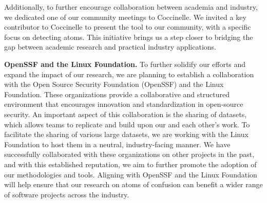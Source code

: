 \documentclass[conference]{IEEEtran}
\begin{document}
Additionally, to further encourage collaboration between 
academia and industry, we dedicated one of our community 
meetings to Coccinelle. We invited a key contributor to 
Coccinelle to present the tool to our community, with a 
specific focus on detecting atoms. This initiative brings us a 
step closer to bridging the gap between academic research and 
practical industry applications.

\textbf{OpenSSF and the Linux Foundation.}
%
To further solidify our efforts and expand the impact of our 
research, we are planning to establish a collaboration with 
the Open Source Security Foundation (OpenSSF) and the Linux 
Foundation. These organizations provide a collaborative and 
structured environment that encourages innovation and 
standardization in open-source security. An important aspect 
of this collaboration is the sharing of datasets, which allows 
teams to replicate and build upon our and each other's work. 
To facilitate the sharing of various large datasets, we are 
working with the Linux Foundation to host them in a neutral, 
industry-facing manner. We have successfully collaborated with 
these organizations on other projects in the past, and with 
this established reputation, we aim to further promote the 
adoption of our methodologies and tools. Aligning with OpenSSF 
and the Linux Foundation will help ensure that our research on 
atoms of confusion can benefit a wider range of software 
projects across the industry.

{\scriptsize  }
\end{document}
